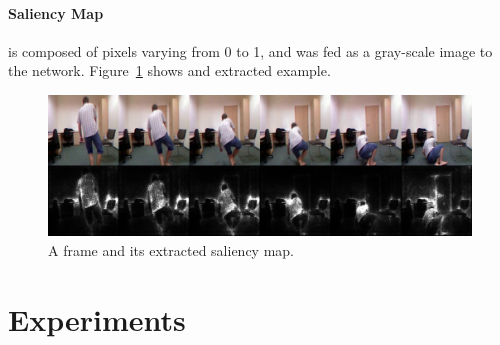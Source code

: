 \documentclass[conference]{IEEEtran}
\begin{document}
\paragraph{Saliency Map} is composed of pixels varying from 0 to 1, and was fed as a gray-scale image to the network. Figure~\ref{fig:sal} shows and extracted example.
\begin{figure}[htbp]
\centerline{\includegraphics[width=\linewidth]{figures/sal.png}}
\caption{A frame and its extracted saliency map.}
\label{fig:sal}
\end{figure}

\section{Experiments}
\label{sec:experiments}
\end{document}
